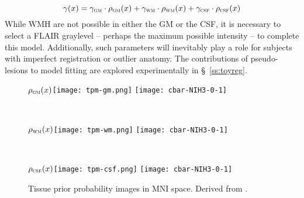 \begin{equation}
\gamma(x) = \gamma_{\textsc{gm}}\cdot\rho_{\textsc{gm}}(x) + \gamma_{\textsc{wm}}\cdot\rho_{\textsc{wm}}(x) + \gamma_{\textsc{csf}}\cdot\rho_{\textsc{csf}}(x)
\end{equation}
While WMH are not possible in either the GM or the CSF, it is necessary to select a FLAIR graylevel -- perhaps the maximum possible intensity -- to complete this model.
Additionally, such parameters will inevitably play a role for subjects with imperfect registration or outlier anatomy.
The contributions of pseudo-lesions to model fitting are explored experimentally in \S\ \ref{ss:toyreg}.
\begin{figure}[h]
  \centering
  \begin{subfigureside}{$\rho_{\textsc{gm}}(x)$}\raggedleft\texttt{[image: tpm-gm.png]} \texttt{[image: cbar-NIH3-0-1]}\end{subfigureside}\\[0.5em]
  \begin{subfigureside}{$\rho_{\textsc{wm}}(x)$}\raggedleft\texttt{[image: tpm-wm.png]} \texttt{[image: cbar-NIH3-0-1]}\end{subfigureside}\\[0.5em]
  \begin{subfigureside}{$\rho_{\textsc{csf}}(x)$}\raggedleft\texttt{[image: tpm-csf.png]} \texttt{[image: cbar-NIH3-0-1]}\end{subfigureside}
  \caption{Tissue prior probability images in MNI space.
Derived from \cite{Mazziotta2001}.}
  \label{fig:tpm-3}
\end{figure}
